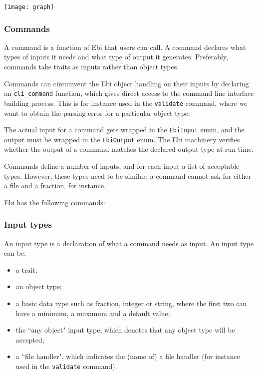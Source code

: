 \documentclass{article}
\def\ebiCommand#1{\texttt{#1}}
\begin{document}
        
        	\texttt{[image: graph]}
        \restoregeometry
    
        \subsubsection{Commands}
            A command is a function of Ebi that users can call.
            A command declares what types of inputs it needs and what type of output it generates. 
            Preferably, commands take traits as inputs rather than object types.
    
            Commands can circumvent the Ebi object handling on their inputs by declaring an \texttt{cli\_command} function, which gives direct access to the command line interface building process.
            This is for instance used in the \ebiCommand{validate} command, where we want to obtain the parsing error for a particular object type.
    
            The actual input for a command gets wrapped in the \texttt{EbiInput} enum, and the output must be wrapped in the \texttt{EbiOutput} enum.
            The Ebi machinery verifies whether the output of a command matches the declared output type at run time.
            
            Commands define a number of inputs, and for each input a list of acceptable types.
            However, these types need to be similar: a command cannot ask for either a file and a fraction, for instance.
    
            Ebi has the following commands:
            \ebicommandlist
    
        \subsubsection{Input types}
            An input type is a declaration of what a command needs as input.
            An input type can be:
            \begin{itemize}
                \item a trait;
                \item an object type;
                \item a basic data type such as fraction, integer or string, where the first two can have a minimum, a maximum and a default value;
                \item the ``any object" input type, which denotes that any object type will be accepted;
                \item a ``file handler", which indicates the (name of) a file handler (for instance used in the \ebiCommand{validate} command).
            \end{itemize}
    
\end{document}
